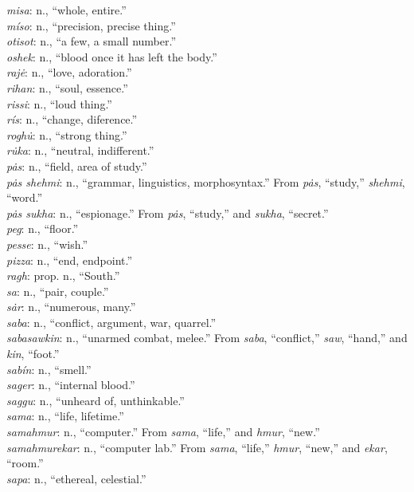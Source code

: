 \documentclass{article}[10pt]
\begin{document}
\begin{multicols}{3}
\emph{misa}: n., ``whole, entire.''\\
\emph{m\'{i}so}: n., ``precision, precise thing.''\\
\emph{otisot}: n., ``a few, a small number.''\\
\emph{oshek}: n., ``blood once it has left the body.''\\
\emph{raj\.{e}}: n., ``love, adoration.''\\
\emph{rihan}: n., ``soul, essence.''\\
\emph{rissi}: n., ``loud thing.''\\
\emph{r\'{i}s}: n., ``change, diference.''\\
\emph{rogh\.{u}}: n., ``strong thing.''\\
\emph{r\.{u}ka}: n., ``neutral, indifferent.''\\
\emph{p\.{a}s}: n., ``field, area of study.''\\
\emph{p\.{a}s shehmi}: n., ``grammar, linguistics, morphosyntax.'' From \emph{p\.{a}s}, ``study,'' \emph{shehmi}, ``word.''\\
\emph{p\.{a}s sukha}: n., ``espionage.'' From \emph{p\.{a}s}, ``study,'' and \emph{sukha}, ``secret.''\\
\emph{peg}: n., ``floor.''\\
\emph{pesse}: n., ``wish.''\\
\emph{pizza}: n., ``end, endpoint.''\\
\emph{ragh}: prop. n., ``South.''\\
\emph{sa}: n., ``pair, couple.''\\
\emph{s\.{a}r}: n., ``numerous, many.''\\
\emph{saba}: n., ``conflict, argument, war, quarrel.''\\
\emph{sabasawkin}: n., ``unarmed combat, melee.'' From \emph{saba}, ``conflict,'' \emph{saw}, ``hand,'' and \emph{kin}, ``foot.''\\
\emph{sab\'{i}n}: n., ``smell.''\\
\emph{sager}: n., ``internal blood.''\\
\emph{saggu}: n., ``unheard of, unthinkable.''\\
\emph{sama}: n., ``life, lifetime.''\\
\emph{samahmur}: n., ``computer.'' From \emph{sama}, ``life,'' and \emph{hmur}, ``new.''\\
\emph{samahmurekar}: n., ``computer lab.'' From \emph{sama}, ``life,'' \emph{hmur}, ``new,'' and \emph{ekar}, ``room.''\\
\emph{sapa}: n., ``ethereal, celestial.''\\

\end{multicols}
\end{document}
